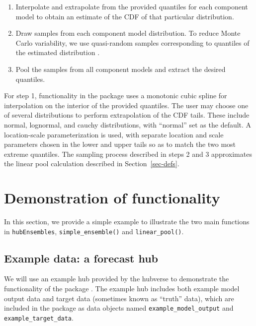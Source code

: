 \documentclass[
  article,
  shortnames,
  notitle]{jss}
\providecommand{\tightlist}{%
  \setlength{\itemsep}{0pt}\setlength{\parskip}{0pt}}\usepackage{longtable,booktabs,array}
\begin{document}
\begin{enumerate}
\def\labelenumi{\arabic{enumi}.}
\tightlist
\item
  Interpolate and extrapolate from the provided quantiles for each
  component model to obtain an estimate of the CDF of that particular
  distribution.
\item
  Draw samples from each component model distribution. To reduce Monte
  Carlo variability, we use quasi-random samples corresponding to
  quantiles of the estimated distribution
  \citep{niederreiter1992quasirandom}.
\item
  Pool the samples from all component models and extract the desired
  quantiles.
\end{enumerate}

For step 1, functionality in the  package uses a
monotonic cubic spline for interpolation on the interior of the provided
quantiles. The user may choose one of several distributions to perform
extrapolation of the CDF tails. These include normal, lognormal, and
cauchy distributions, with ``normal'' set as the default. A
location-scale parameterization is used, with separate location and
scale parameters chosen in the lower and upper tails so as to match the
two most extreme quantiles. The sampling process described in steps 2
and 3 approximates the linear pool calculation described in
Section~\ref{sec-defs}.

\section{Demonstration of functionality}\label{sec-simple-ex}

In this section, we provide a simple example to illustrate the two main
functions in \texttt{hubEnsembles}, \texttt{simple\_ensemble()} and
\texttt{linear\_pool()}.

\subsection{Example data: a forecast
hub}\label{example-data-a-forecast-hub}

We will use an example hub provided by the hubverse to demonstrate the
functionality of the  package \citep{hubverse_docs}.
The example hub includes both example model output data and target data
(sometimes known as ``truth'' data), which are included in the
 package as data objects named
\texttt{example\_model\_output} and \texttt{example\_target\_data}.
\end{document}
